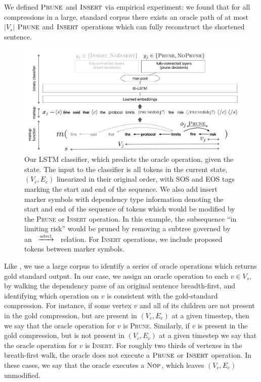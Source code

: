 \documentclass[11pt,a4paper]{article}
\newcommand{\rdep}[1]{\ $\xrightarrow{\text{\tiny #1}}$\ }
\begin{document}
We defined $\textsc{Prune}$ and $\textsc{Insert}$ via empirical experiment: we found that for all compressions in a large, standard  corpus \cite{filippova2013overcoming} there exists an oracle path of at most $|V_s|$ $\textsc{Prune}$ and $\textsc{Insert}$ operations which can fully reconstruct the shortened sentence. 

\begin{figure}[htb!]
\centering
\includegraphics[width=.75\textwidth]{example.pdf}
\caption{Our LSTM classifier, which predicts the oracle operation, given the state. The input to the classifier is all tokens in the current state, $(V_c, E_c)$ linearized in their original order, with SOS and EOS tags marking the start and end of the sequence. We also add insert marker symbols with dependency type information denoting the start and end of the sequence of tokens which would be modified by the \textsc{Prune} or \textsc{Insert} operation. In this example, the subsequence ``in limiting risk'' would be pruned by removing a subtree governed by an \rdep{advcl} relation. For \textsc{Insert} operations, we include proposed tokens between marker symbols.}
\label{f:example}
\end{figure}

Like \cite{D14-1082}, we use a large corpus to identify a series of oracle operations which returns gold standard output. In our case, we assign an oracle operation to each $v \in V_s$, by walking the dependency parse of an original sentence breadth-first, and identifying which operation on $v$ is consistent with the gold-standard compression. For instance, if some vertex $v$ and all of its children are not present in the gold compression, but are present in ${(V_c,E_c)}$ at a given timestep, then we say that the oracle operation for $v$ is \textsc{Prune}. Similarly, if $v$ is present in the gold compression, but is not present in ${(V_c,E_c)}$ at a given timestep we say that the oracle operation for $v$ is \textsc{Insert}. For roughly two thirds of vertexes in the breath-first walk, the oracle does not execute a $\textsc{Prune}$ or $\textsc{Insert}$ operation. In these cases, we say that the oracle executes a $\textsc{Nop}$, which leaves ${(V_c,E_c)}$ unmodified. 
\end{document}
